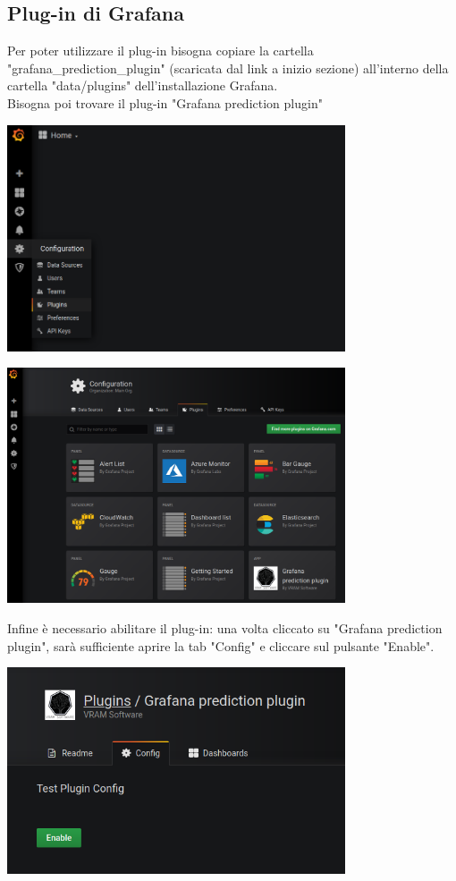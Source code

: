 \subsection{Plug-in di Grafana}
Per poter utilizzare il plug-in bisogna copiare la cartella "grafana\_prediction\_plugin" (scaricata dal link a inizio sezione) all'interno della cartella "data/plugins" dell'installazione Grafana\glo. \\
Bisogna poi trovare il plug-in "Grafana prediction plugin"
\begin{center}
	\includegraphics[width=10cm]{img/inserimento-plugin1.png}
\end{center}

\begin{center}
	\includegraphics[width=10cm]{img/inserimento-plugin2.png}
\end{center}

Infine è necessario abilitare il plug-in: una volta cliccato su "Grafana prediction plugin", sarà sufficiente aprire la tab "Config" e cliccare sul pulsante "Enable".

\begin{center}
	\includegraphics[width=10cm]{img/inserimento-plugin3.png}
\end{center}

